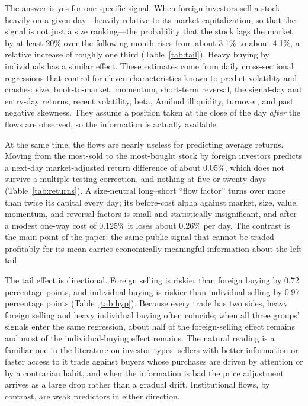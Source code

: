 \documentclass[11pt]{article}
\begin{document}
The answer is yes for one specific signal. When foreign investors sell a stock heavily on a given day---heavily
relative to its market capitalization, so that the signal is not just a size ranking---the probability that the stock
lags the market by at least 20\% over the following month rises from about 3.1\% to about 4.1\%, a relative increase of
roughly one third (Table~\ref{tab:tail}). Heavy buying by individuals has a similar effect. These estimates come from
daily cross-sectional regressions that control for eleven characteristics known to predict volatility and crashes:
size, book-to-market, momentum, short-term reversal, the signal-day and entry-day returns, recent volatility, beta,
Amihud illiquidity, turnover, and past negative skewness. They assume a position taken at the close of the day
\emph{after} the flows are observed, so the information is actually available.

At the same time, the flows are nearly useless for predicting average returns. Moving from the most-sold to the
most-bought stock by foreign investors predicts a next-day market-adjusted return difference of about 0.05\%, which
does not survive a multiple-testing correction, and nothing at five or twenty days (Table~\ref{tab:returns}). A size-neutral
long--short ``flow factor'' turns over more than twice its capital every day; its before-cost alpha against market,
size, value, momentum, and reversal factors is small and statistically insignificant, and after a modest one-way cost
of 0.125\% it loses about 0.26\% per day. The contrast is the main point of the paper: the same public signal that
cannot be traded profitably for its mean carries economically meaningful information about the left tail.

The tail effect is directional. Foreign selling is riskier than foreign buying by 0.72 percentage points, and
individual buying is riskier than individual selling by 0.97 percentage points (Table~\ref{tab:hyp}). Because every
trade has two sides, heavy foreign selling and heavy individual buying often coincide; when all three groups' signals
enter the same regression, about half of the foreign-selling effect remains and most of the individual-buying effect
remains. The natural reading is a familiar one in the literature on investor types: sellers with better information
or faster access to it trade against buyers whose purchases are driven by attention or by a contrarian habit, and when
the information is bad the price adjustment arrives as a large drop rather than a gradual drift. Institutional flows,
by contrast, are weak predictors in either direction.
\end{document}
